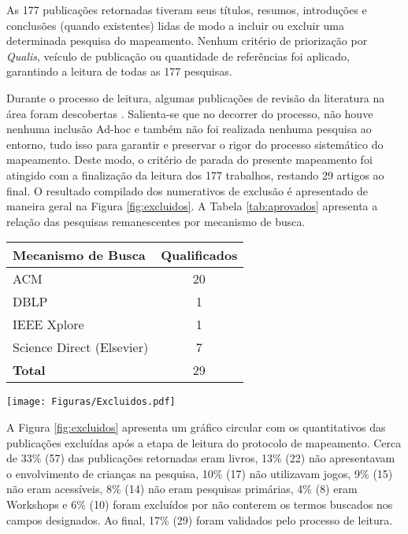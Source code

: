 \documentclass[12pt]{article}
\begin{document}
As 177 publicações retornadas tiveram seus títulos, resumos, introduções e conclusões (quando existentes) lidas de modo a incluir ou excluir uma determinada pesquisa do mapeamento. Nenhum critério de priorização por \textit{Qualis}, veículo de publicação ou quantidade de referências foi aplicado, garantindo a leitura de todas as 177 pesquisas. 

Durante o processo de leitura, algumas publicações de revisão da literatura na área foram descobertas \cite{calvo2020serious, alonso2019applications}. Salienta-se que no decorrer do processo, não houve nenhuma inclusão Ad-hoc e também não foi realizada nenhuma pesquisa ao entorno, tudo isso para garantir e preservar o rigor do processo sistemático do mapeamento. Deste modo, o critério de parada do presente mapeamento foi atingido com a finalização da leitura dos 177 trabalhos, restando 29 artigos ao final. O resultado compilado dos numerativos de exclusão é apresentado de maneira geral na Figura \ref{fig:excluidos}. A Tabela \ref{tab:aprovados} apresenta a relação das pesquisas remanescentes por mecanismo de busca. 

\newpage

{\centering
{}\label{tab:aprovados}
\begin{tabular}{l*{1}c}
\textbf{Mecanismo de Busca}              & \textbf{Qualificados} \\
\hline
ACM  & 20   \\
DBLP            & 1   \\
IEEE Xplore           & 1   \\
Science Direct (Elsevier)    & 7   \\
\hline
\textbf{Total}           & 29
\end{tabular}
}

\begin{figure*}[ht]
\vspace{-5.0cm}
\hspace{7.1cm}
\texttt{[image: Figuras/Excluidos.pdf]}
\caption{\raggedleft Publicações excluídas}\label{fig:excluidos}
\end{figure*}

A Figura \ref{fig:excluidos} apresenta um gráfico circular com os quantitativos das publicações excluídas após a etapa de leitura do protocolo de mapeamento. Cerca de 33\% (57) das publicações retornadas eram livros, 13\% (22) não apresentavam o envolvimento de crianças na pesquisa, 10\% (17) não utilizavam jogos, 9\% (15) não eram acessíveis, 8\% (14) não eram pesquisas primárias, 4\% (8) eram Workshops e 6\% (10) foram excluídos por não conterem os termos buscados nos campos designados. Ao final, 17\% (29) foram validados pelo processo de leitura.
\end{document}
